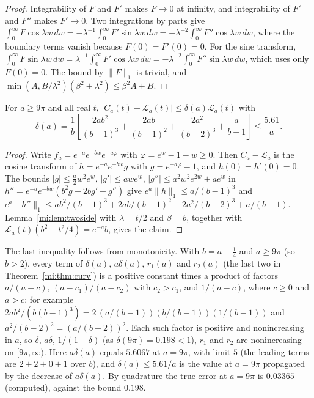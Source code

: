 \begin{proof}
Integrability of $F$ and $F'$ makes $F\to0$ at infinity, and integrability of $F'$ and $F''$ makes $F'\to0$. Two integrations by parts give $\int_0^\infty F\cos\lambda w\,dw=-\lambda^{-1}\int_0^\infty F'\sin\lambda w\,dw=-\lambda^{-2}\int_0^\infty F''\cos\lambda w\,dw$, where the boundary terms vanish because $F(0)=F'(0)=0$. For the sine transform, $\int_0^\infty F\sin\lambda w\,dw=\lambda^{-1}\int_0^\infty F'\cos\lambda w\,dw=-\lambda^{-2}\int_0^\infty F''\sin\lambda w\,dw$, which uses only $F(0)=0$. The bound by $\|F\|_1$ is trivial, and $\min(A,B/\lambda^2)(\beta^2+\lambda^2)\le\beta^2A+B$.
\end{proof}

\begin{theorem}\label{mi:thm:lorentz}
For $a\ge9\pi$ and all real $t$, $|C_a(t)-\mathcal L_a(t)|\le\delta(a)\mathcal L_a(t)$ with
\[
\delta(a)=\frac1b\left[\frac{2ab^2}{(b-1)^3}+\frac{2ab}{(b-1)^2}+\frac{2a^2}{(b-2)^3}+\frac a{b-1}\right]\le\frac{5.61}a .
\]
\end{theorem}

\begin{proof}
Write $f_a=e^{-a}e^{-bw}e^{-a\varphi}$ with $\varphi=e^w-1-w\ge0$. Then $C_a-\mathcal L_a$ is the cosine transform of $h=e^{-a}e^{-bw}g$ with $g=e^{-a\varphi}-1$, and $h(0)=h'(0)=0$. The bounds $|g|\le\tfrac a2w^2e^w$, $|g'|\le awe^w$, $|g''|\le a^2w^2e^{2w}+ae^w$ in $h''=e^{-a}e^{-bw}(b^2g-2bg'+g'')$ give $e^a\|h\|_1\le a/(b-1)^3$ and $e^a\|h''\|_1\le ab^2/(b-1)^3+2ab/(b-1)^2+2a^2/(b-2)^3+a/(b-1)$. Lemma~\ref{mi:lem:twoside} with $\lambda=t/2$ and $\beta=b$, together with $\mathcal L_a(t)(b^2+t^2/4)=e^{-a}b$, gives the claim.
\end{proof}

The last inequality follows from monotonicity. With $b=a-\frac14$ and $a\ge9\pi$ (so $b>2$), every term of $\delta(a)$, $a\delta(a)$, $r_1(a)$ and $r_2(a)$ (the last two in Theorem~\ref{mi:thm:curv}) is a positive constant times a product of factors $a/(a-c)$, $(a-c_1)/(a-c_2)$ with $c_2>c_1$, and $1/(a-c)$, where $c\ge0$ and $a>c$; for example $2ab^2/(b(b-1)^3)=2\,(a/(b-1))(b/(b-1))(1/(b-1))$ and $a^2/(b-2)^2=(a/(b-2))^2$. Each such factor is positive and nonincreasing in $a$, so $\delta$, $a\delta$, $1/(1-\delta)$ (as $\delta(9\pi)=0.198<1$), $r_1$ and $r_2$ are nonincreasing on $[9\pi,\infty)$. Here $a\delta(a)$ equals $5.6067$ at $a=9\pi$, with limit $5$ (the leading terms are $2+2+0+1$ over $b$), and $\delta(a)\le5.61/a$ is the value at $a=9\pi$ propagated by the decrease of $a\delta(a)$. By quadrature the true error at $a=9\pi$ is $0.03365$ (computed), against the bound $0.198$.

